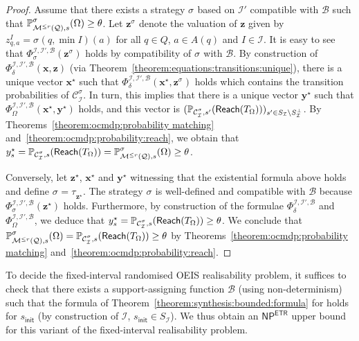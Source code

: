 \documentclass[a4paper,UKenglish,cleveref,autoref,thm-restate,colorlinks]{lipics-v2021}
\newcommand{\init}{\mathsf{init}}
\newcommand{\np}{\textsf{NP}}
\newcommand{\etr}{\textsf{ETR}}
\newcommand{\mdp}{\mathcal{M}}
\newcommand{\mdpStateSpace}{S}
\newcommand{\ocmdp}{\mathcal{Q}}
\newcommand{\ocmdpFin}[2]{\mdp^{\leq #2}(#1)}
\newcommand{\ocStateSpace}{Q}
\newcommand{\ocState}{q}
\newcommand{\ocConfig}{s}
\newcommand{\ocActionSpace}{A}
\newcommand{\ocAction}{a}
\newcommand{\ocTrans}{\delta}
\newcommand{\counterUB}{r}
\newcommand{\mchain}{\mathcal{C}}
\newcommand{\intPart}{\mathcal{I}}
\newcommand{\interval}{I}
\newcommand{\compressChainStrat}[1]{\mchain^{#1}_{\intPart}}
\newcommand{\compressChain}{\compressChainStrat{\strat}}
\newcommand{\compressChainStateSpace}{\mdpStateSpace_{\intPart}}
\newcommand{\compressChainStateSpaceStar}{\mdpStateSpace_{\intPart}^{\bot}}
\newcommand{\varTrans}{x}
\newcommand{\varTransTuple}{\mathbf{\varTrans}}
\newcommand{\solTransTuple}{\mathbf{\varTrans}^{\star}}
\newcommand{\varObj}{y}
\newcommand{\solObj}{\varObj^{\star}}
\newcommand{\solObjTuple}{\mathbf{\varObj}^{\star}}
\newcommand{\varStrat}{z}
\newcommand{\varStratTuple}{\mathbf{\varStrat}}
\newcommand{\solStratTuple}{\mathbf{\varStrat}^{\star}}
\newcommand{\vectStratTuple}{\varStratTuple^\strat}
\newcommand{\formulaTransBase}{\Phi_{\ocTrans}}
\newcommand{\formulaObjBase}{\Phi_{\objective}}
\newcommand{\formulaStratBase}{\Phi_{\strat}}
\newcommand{\suppBounded}{\mathcal{B}}
\newcommand{\formulaStratB}{\formulaStratBase^{\intPart,\intPart',\suppBounded}}
\newcommand{\formulaTransB}{\formulaTransBase^{\intPart,\intPart',\suppBounded}}
\newcommand{\formulaObjB}{\formulaObjBase^{\intPart,\intPart',\suppBounded}}
\newcommand{\objective}{\Omega}
\newcommand{\reach}[1]{\mathsf{Reach}(#1)}
\newcommand{\target}{T}
\newcommand{\thresProba}{\theta}
\newcommand{\stratGeneric}[1]{{\sigma_{#1}}}
\newcommand{\strat}{\stratGeneric{}}
\newcommand{\stratBGeneric}[1]{{\tau_{#1}}}
\newcommand{\stratB}{\stratBGeneric{}}
\begin{document}
\begin{proof}
  Assume that there exists a strategy $\strat$ based on $\intPart'$ compatible with $\suppBounded$ such that $\probaGverb{\ocmdpFin{\ocmdp}{\counterUB}}{\ocConfig}{\strat}(\objective) \geq\thresProba$.
  Let $\vectStratTuple$ denote the valuation of $\varStratTuple$ given by $\varStrat^\interval_{\ocState,\ocAction}=\strat(\ocState, \min\interval)(\ocAction)$ for all $\ocState\in\ocStateSpace$, $\ocAction\in\ocActionSpace(\ocState)$ and $\interval\in\intPart$.
  It is easy to see that $\formulaStratB(\vectStratTuple)$ holds by compatibility of $\strat$ with $\suppBounded$.
  By construction of $\formulaTransB(\varTransTuple, \varStratTuple)$ (via Theorem~\ref{theorem:equations:transitions:unique}), there is a unique vector $\solTransTuple$ such that $\formulaTransB(\solTransTuple, \vectStratTuple)$ holds which contains the transition probabilities of $\compressChain$.
  In turn, this implies that there is a unique vector $\solObjTuple$ such that $\formulaObjB(\solTransTuple, \solObjTuple)$ holds, and this vector is $(\probaMCverb{\compressChain}{\ocConfig'}(\reach{\target_\objective}))_{\ocConfig'\in\compressChainStateSpace\setminus\compressChainStateSpaceStar}$.
  By Theorems~\ref{theorem:ocmdp:probability matching} and~\ref{theorem:ocmdp:probability:reach}, we obtain that $\solObj_\ocConfig = \probaMCverb{\compressChain}{\ocConfig}(\reach{\target_\objective}) = \probaGverb{\ocmdpFin{\ocmdp}{\counterUB}}{\ocConfig}{\strat}(\objective) \geq\thresProba$.

  Conversely, let $\solStratTuple$, $\solTransTuple$ and $\solObjTuple$ witnessing that the existential formula above holds and define $\strat = \stratB_{\solStratTuple}$.
  The strategy $\strat$ is well-defined and compatible with $\suppBounded$ because $\formulaStratB(\solStratTuple)$ holds.
  Furthermore, by construction of the formulae $\formulaTransB$ and $\formulaObjB$, we deduce that $\solObj_\ocConfig = \probaMCverb{\compressChain}{\ocConfig}(\reach{\target_\objective})\geq\thresProba$.
  We conclude that $\probaGverb{\ocmdpFin{\ocmdp}{\counterUB}}{\ocConfig}{\strat}(\objective)=\probaMCverb{\compressChain}{\ocConfig}(\reach{\target_\objective}) \geq\thresProba$ by Theorems~\ref{theorem:ocmdp:probability matching} and~\ref{theorem:ocmdp:probability:reach}.
\end{proof}

To decide the fixed-interval randomised OEIS realisability problem, it suffices to check that there exists a support-assigning function $\suppBounded$ (using non-determinism) such that the formula of Theorem~\ref{theorem:synthesis:bounded:formula} for holds for $\ocConfig_\init$ (by construction of $\intPart$, $\ocConfig_\init\in\compressChainStateSpace$).
We thus obtain an $\np^\etr$ upper bound for this variant of the fixed-interval realisability problem.
\end{document}
